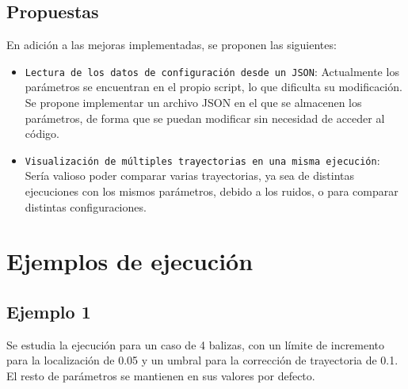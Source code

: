 \subsection{Propuestas}
En adición a las mejoras implementadas, se proponen las siguientes:
\begin{itemize}
  \item \texttt{Lectura de los datos de configuración desde un JSON}: Actualmente los parámetros se encuentran en el propio script, lo que dificulta su modificación. Se propone implementar un archivo JSON en el que se almacenen los parámetros, de forma que se puedan modificar sin necesidad de acceder al código.
  \item \texttt{Visualización de múltiples trayectorias en una misma ejecución}: Sería valioso poder comparar varias trayectorias, ya sea de distintas ejecuciones con los mismos parámetros, debido a los ruidos, o para comparar distintas configuraciones.
\end{itemize}
\section{Ejemplos de ejecución}
\subsection{Ejemplo 1}
Se estudia la ejecución para un caso de 4 balizas, con un límite de incremento para la localización de 0.05 y un umbral para la corrección de trayectoria de 0.1. El resto de parámetros se mantienen en sus valores por defecto.

